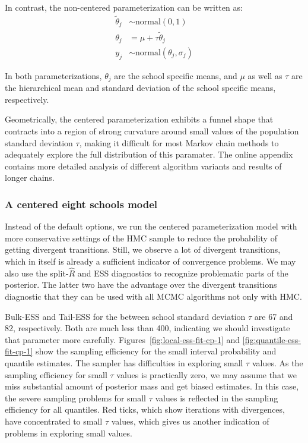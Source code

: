 \documentclass[american,]{article}
\theoremstyle{definition}
\begin{document}
In contrast, the non-centered parameterization can be written as:
\begin{align*}
\tilde{\theta}_j &\sim \text{normal}(0, 1) \\
\theta_j &= \mu + \tau \tilde{\theta}_j \\
y_j &\sim \text{normal}(\theta_j, \sigma_j)
\end{align*}

In both parameterizations, $\theta_j$ are the school specific means,
and $\mu$ as well as $\tau$ are the hierarchical mean and standard deviation 
of the school specific means, respectively.

Geometrically, the centered parameterization exhibits a funnel shape
that contracts into a region of strong curvature around small
values of the population standard deviation $\tau$, making it difficult for most
Markov chain methods to adequately explore the full distribution of this
paramater. The online appendix contains more detailed analysis of different 
algorithm variants and results of longer chains.

\hypertarget{a-centered-eight-schools-model}{%
\subsubsection*{A centered eight schools
model}\label{a-centered-eight-schools-model}}

Instead of the default options, we run the centered parameterization
model with more conservative settings of the HMC sample to reduce the
probability of getting divergent transitions. Still, we observe a lot of divergent
transitions, which in itself is already a sufficient indicator of
convergence problems. We may also use the split-\(\widehat{R}\) and ESS
diagnostics to recognize problematic parts of the posterior. The latter
two have the advantage over the divergent transitions diagnostic that they
can be used with all MCMC algorithms not only with HMC.

Bulk-ESS and Tail-ESS for the between school standard deviation $\tau$
are 67 and 82, respectively. Both are much less than 400, indicating we
should investigate that parameter more carefully.
Figures~\ref{fig:local-ess-fit-cp-1} and
\ref{fig:quantile-ess-fit-cp-1} show the sampling efficiency for the
small interval probability and quantile estimates.
The sampler has difficulties in exploring small $\tau$ values. As the
sampling efficiency for small $\tau$ values is practically zero, we
may assume that we miss substantial amount of posterior mass and
get biased estimates. In this case, the severe sampling problems for
small $\tau$ values is reflected in the sampling efficiency for all
quantiles. Red ticks, which show iterations with divergences, have
concentrated to small $\tau$ values, which gives us another indication
of problems in exploring small values.
\end{document}
